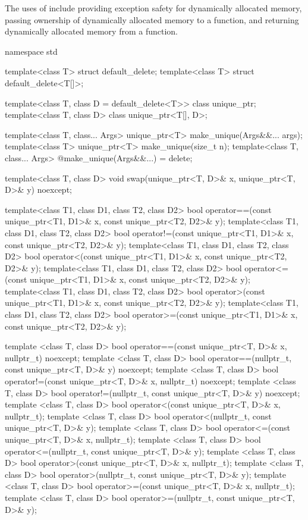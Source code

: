 \pnum
\enternote The uses
of  include providing exception safety for
dynamically allocated memory, passing ownership of dynamically allocated
memory to a function, and returning dynamically allocated memory from a
function. \exitnote

\begin{codeblock}
namespace std {
  template<class T> struct default_delete;
  template<class T> struct default_delete<T[]>;

  template<class T, class D = default_delete<T>> class unique_ptr;
  template<class T, class D> class unique_ptr<T[], D>;

  template<class T, class... Args> unique_ptr<T> make_unique(Args&&... args);
  template<class T> unique_ptr<T> make_unique(size_t n);
  template<class T, class... Args> @\unspec@ make_unique(Args&&...) = delete;

  template<class T, class D> void swap(unique_ptr<T, D>& x, unique_ptr<T, D>& y) noexcept;

  template<class T1, class D1, class T2, class D2>
    bool operator==(const unique_ptr<T1, D1>& x, const unique_ptr<T2, D2>& y);
  template<class T1, class D1, class T2, class D2>
    bool operator!=(const unique_ptr<T1, D1>& x, const unique_ptr<T2, D2>& y);
  template<class T1, class D1, class T2, class D2>
    bool operator<(const unique_ptr<T1, D1>& x, const unique_ptr<T2, D2>& y);
  template<class T1, class D1, class T2, class D2>
    bool operator<=(const unique_ptr<T1, D1>& x, const unique_ptr<T2, D2>& y);
  template<class T1, class D1, class T2, class D2>
    bool operator>(const unique_ptr<T1, D1>& x, const unique_ptr<T2, D2>& y);
  template<class T1, class D1, class T2, class D2>
    bool operator>=(const unique_ptr<T1, D1>& x, const unique_ptr<T2, D2>& y);

  template <class T, class D>
    bool operator==(const unique_ptr<T, D>& x, nullptr_t) noexcept;
  template <class T, class D>
    bool operator==(nullptr_t, const unique_ptr<T, D>& y) noexcept;
  template <class T, class D>
    bool operator!=(const unique_ptr<T, D>& x, nullptr_t) noexcept;
  template <class T, class D>
    bool operator!=(nullptr_t, const unique_ptr<T, D>& y) noexcept;
  template <class T, class D>
    bool operator<(const unique_ptr<T, D>& x, nullptr_t);
  template <class T, class D>
    bool operator<(nullptr_t, const unique_ptr<T, D>& y);
  template <class T, class D>
    bool operator<=(const unique_ptr<T, D>& x, nullptr_t);
  template <class T, class D>
    bool operator<=(nullptr_t, const unique_ptr<T, D>& y);
  template <class T, class D>
    bool operator>(const unique_ptr<T, D>& x, nullptr_t);
  template <class T, class D>
    bool operator>(nullptr_t, const unique_ptr<T, D>& y);
  template <class T, class D>
    bool operator>=(const unique_ptr<T, D>& x, nullptr_t);
  template <class T, class D>
    bool operator>=(nullptr_t, const unique_ptr<T, D>& y);

}
\end{codeblock}

